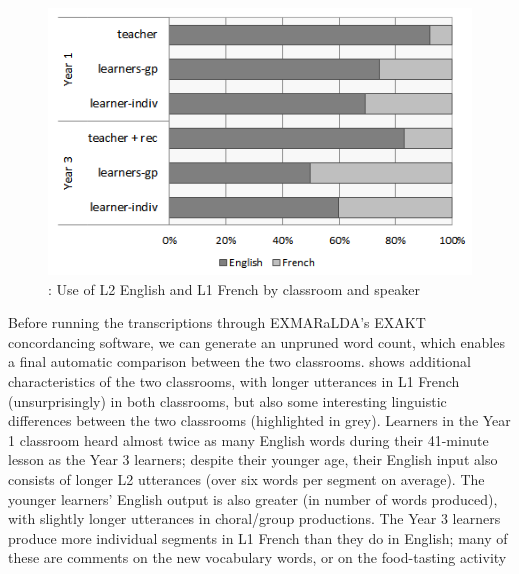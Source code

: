\documentclass[output=paper,colorlinks,citecolor=brown,modfonts,nonflat]{../langscibook}
\begin{document}
\begin{figure}
\caption{\label{fig:hilton:3}: Use of L2 English and L1 French by classroom and speaker}
\includegraphics[width=\textwidth]{figures/hilton-img003.png}
\end{figure}
 

Before running the transcriptions through EXMARaLDA’s \MakeUppercase{Exakt} concordancing software, we can generate an unpruned word count, which enables a final automatic comparison between the two classrooms.  shows additional characteristics of the two classrooms, with longer utterances in L1 French (unsurprisingly) in both classrooms, but also some interesting linguistic differences between the two classrooms (highlighted in grey). Learners in the Year 1 classroom heard almost twice as many English words during their 41-minute lesson as the Year 3 learners; despite their younger age, their English input also consists of longer L2 utterances (over six words per segment on average). The younger learners’ English output is also greater (in number of words produced), with slightly longer utterances in choral/group productions. The Year 3 learners produce more individual segments in L1 French than they do in English; many of these are comments on the new vocabulary words, or on the food-tasting activity
\end{document}
